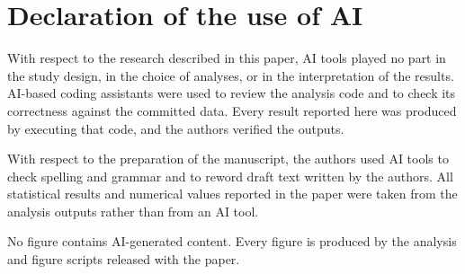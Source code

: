 \documentclass{imag-ms-template}
\newcommand{\todo}[1]{\textcolor{red}{#1}}
\begin{document}



%
%

\clearpage

%
\section*{Declaration of the use of AI}

With respect to the research described in this paper, AI tools played no part in
the study design, in the choice of analyses, or in the interpretation of the
results. AI-based coding assistants were used to review the analysis code and to
check its correctness against the committed data. Every result reported here was
produced by executing that code, and the authors verified the outputs.

With respect to the preparation of the manuscript, the authors used AI tools to
check spelling and grammar and to reword draft text written by the authors. All
statistical results and numerical values reported in the paper were taken from
the analysis outputs rather than from an AI tool.

No figure contains AI-generated content. Every figure is produced by the analysis
and figure scripts released with the paper.
\end{document}
